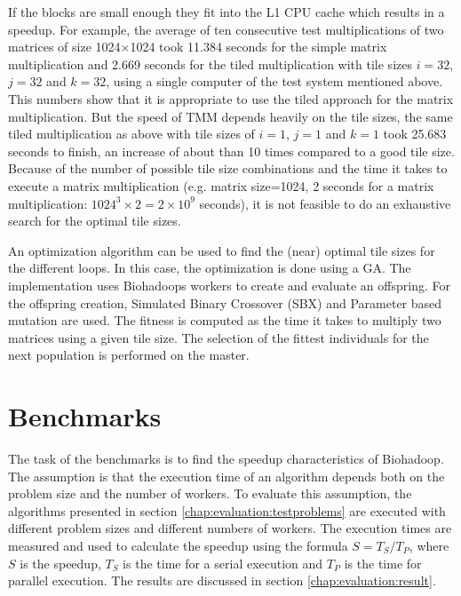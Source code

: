 If the blocks are small enough they fit into the L1 CPU cache which results in a speedup. For example, the average of ten consecutive test multiplications of two matrices of size 1024$\times$1024 took 11.384 seconds for the simple matrix multiplication and 2.669 seconds for the tiled multiplication with tile sizes $i=32$, $j=32$ and $k=32$, using a single computer of the test system mentioned above. This numbers show that it is appropriate to use the tiled approach for the matrix multiplication. But the speed of TMM depends heavily on the tile sizes, the same tiled multiplication as above with tile sizes of $i=1$, $j=1$ and $k=1$ took 25.683 seconds to finish, an increase of about than 10 times compared to a good tile size. Because of the number of possible tile size combinations and the time it takes to execute a matrix multiplication (e.g. matrix size=1024, 2 seconds for a matrix multiplication: $1024^3 \times 2 = 2\times{10^9} $ seconds), it is not feasible to do an exhaustive search for the optimal tile sizes.

An optimization algorithm can be used to find the (near) optimal tile sizes for the different loops. In this case, the optimization is done using a GA. The implementation uses Biohadoops workers to create and evaluate an offspring. For the offspring creation, Simulated Binary Crossover (SBX) and Parameter based mutation are used. The fitness is computed as the time it takes to multiply two matrices using a given tile size. The selection of the fittest individuals for the next population is performed on the master.

\section{Benchmarks}
\label{chap:evaluation:benchmarks}
The task of the benchmarks is to find the speedup characteristics of Biohadoop. The assumption is that the execution time of an algorithm depends both on the problem size and the number of workers. To evaluate this assumption, the algorithms presented in section \ref{chap:evaluation:testproblems} are executed with different problem sizes and different numbers of workers. The execution times are measured and used to calculate the speedup using the formula $S = T_S / T_P$, where $S$ is the speedup, $T_S$ is the time for a serial execution and $T_P$ is the time for parallel execution. The results are discussed in section \ref{chap:evaluation:result}.


